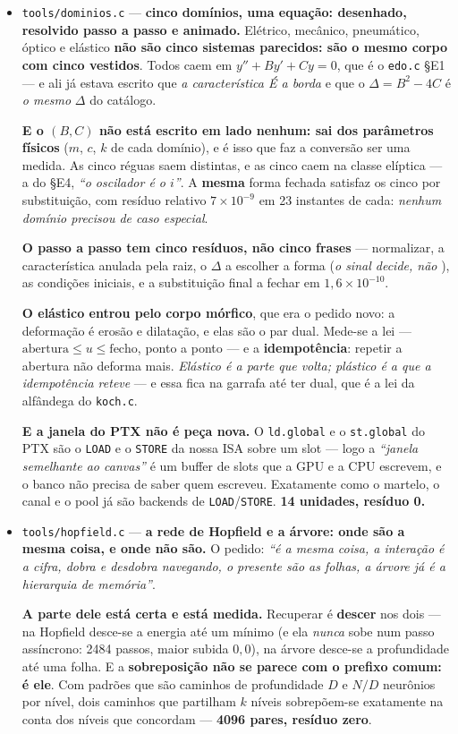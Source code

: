 \documentclass[11pt]{article}
\newcommand{\code}[1]{\texttt{\small #1}}
\theoremstyle{plain}
\theoremstyle{remark}
\begin{document}
\begin{itemize}
\item \code{tools/dominios.c} --- \textbf{cinco domínios, uma equação: desenhado, resolvido passo a
passo e animado.} Elétrico, mecânico, pneumático, óptico e elástico \textbf{não são cinco sistemas
parecidos: são o mesmo corpo com cinco vestidos}. Todos caem em $y''+By'+Cy=0$, que é o
\code{edo.c} §E1 --- e ali já estava escrito que \emph{a característica É a borda} e que o
$\Delta=B^2-4C$ é \emph{o mesmo} $\Delta$ do catálogo.

\textbf{E o $(B,C)$ não está escrito em lado nenhum: sai dos parâmetros físicos} ($m$, $c$, $k$ de
cada domínio), e é isso que faz a conversão ser uma medida. As cinco réguas saem distintas, e as
cinco caem na classe elíptica --- a do §E4, \emph{``o oscilador é o $i$''}. A \textbf{mesma} forma
fechada satisfaz os cinco por substituição, com resíduo relativo $7\times10^{-9}$ em 23 instantes
de cada: \emph{nenhum domínio precisou de caso especial}.

\textbf{O passo a passo tem cinco resíduos, não cinco frases} --- normalizar, a característica
anulada pela raiz, o $\Delta$ a escolher a forma (\emph{o sinal decide, não }), as condições
iniciais, e a substituição final a fechar em $1{,}6\times10^{-10}$.

\textbf{O elástico entrou pelo corpo mórfico}, que era o pedido novo: a deformação é erosão e
dilatação, e elas são o par dual. Mede-se a lei --- $\text{abertura}\le u\le\text{fecho}$, ponto a
ponto --- e a \textbf{idempotência}: repetir a abertura não deforma mais. \emph{Elástico é a parte
que volta; plástico é a que a idempotência reteve} --- e essa fica na garrafa até ter dual, que é a
lei da alfândega do \code{koch.c}.

\textbf{E a janela do PTX não é peça nova.} O \code{ld.global} e o \code{st.global} do PTX são o
\code{LOAD} e o \code{STORE} da nossa ISA sobre um slot --- logo a \emph{``janela semelhante ao
canvas''} é um buffer de slots que a GPU e a CPU escrevem, e o banco não precisa de saber quem
escreveu. Exatamente como o martelo, o canal e o pool já são backends de \code{LOAD}/\code{STORE}.
\textbf{14 unidades, resíduo 0.}


\item \code{tools/hopfield.c} --- \textbf{a rede de Hopfield e a árvore: onde são a mesma coisa, e
onde não são.} O pedido: \emph{``é a mesma coisa, a interação é a cifra, dobra e desdobra navegando,
o presente são as folhas, a árvore já é a hierarquia de memória''}.

\textbf{A parte dele está certa e está medida.} Recuperar é \textbf{descer} nos dois --- na Hopfield
desce-se a energia até um mínimo (e ela \emph{nunca} sobe num passo assíncrono: 2484 passos, maior
subida $0{,}0$), na árvore desce-se a profundidade até uma folha. E a \textbf{sobreposição não se
parece com o prefixo comum: é ele}. Com padrões que são caminhos de profundidade $D$ e $N/D$
neurônios por nível, dois caminhos que partilham $k$ níveis sobrepõem-se exatamente na conta dos
níveis que concordam --- \textbf{4096 pares, resíduo zero}.


\end{itemize}
\end{document}
